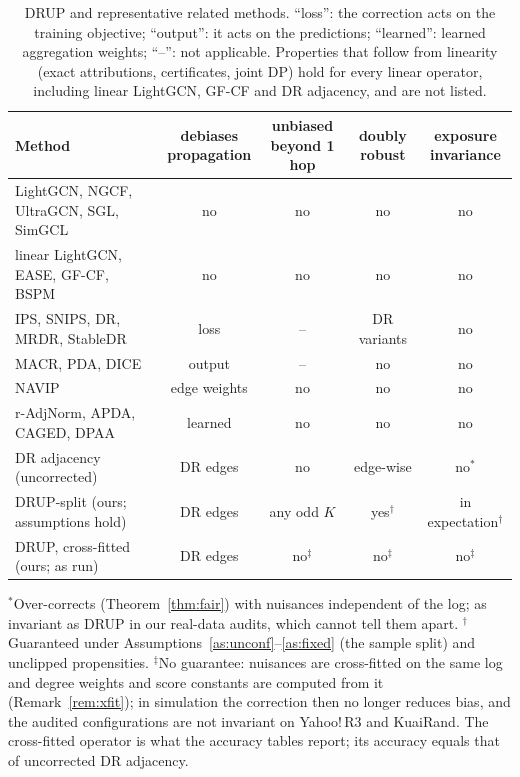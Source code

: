 \documentclass[preprint,review,12pt,authoryear]{elsarticle}
\theoremstyle{definition}
\begin{document}
\begin{table}[t]\centering\footnotesize
\caption{DRUP and representative related methods. ``loss'': the correction
acts on the training objective; ``output'': it acts on the predictions;
``learned'': learned aggregation weights; ``--'': not applicable. Properties
that follow from linearity (exact attributions, certificates, joint DP) hold
for every linear operator, including linear LightGCN, GF-CF and DR adjacency,
and are not listed.}\label{tab:related}
\setlength{\tabcolsep}{4pt}
\begin{adjustbox}{max width=\textwidth}
\begin{tabular}{lcccc}
\toprule
Method & \shortstack{debiases\\propagation} & \shortstack{unbiased\\beyond 1 hop} & \shortstack{doubly\\robust} &
\shortstack{exposure\\invariance}\\
\midrule
\shortstack[l]{LightGCN, NGCF,\\UltraGCN, SGL, SimGCL} & no & no & no & no\\[2pt]
\shortstack[l]{linear LightGCN,\\EASE, GF-CF, BSPM} & no & no & no & no\\[2pt]
\shortstack[l]{IPS, SNIPS, DR,\\MRDR, StableDR} & loss & -- & DR variants & no\\[2pt]
MACR, PDA, DICE & output & -- & no & no\\
NAVIP & edge weights & no & no & no\\
\shortstack[l]{r-AdjNorm, APDA,\\CAGED, DPAA} & learned & no & no & no\\[2pt]
DR adjacency (uncorrected) & DR edges & no & edge-wise & no$^\ast$\\
\midrule
DRUP-split (ours; assumptions hold) & DR edges & any odd $K$ & yes$^\dagger$ & in expectation$^\dagger$\\
DRUP, cross-fitted (ours; as run) & DR edges & no$^\ddagger$ & no$^\ddagger$ & no$^\ddagger$\\
\bottomrule
\end{tabular}
\end{adjustbox}
\par\smallskip
\raggedright\scriptsize $^\ast$Over-corrects (Theorem~\ref{thm:fair}) with nuisances independent of the log; as invariant as DRUP in our real-data audits, which cannot tell them apart.
$^\dagger$Guaranteed under Assumptions~\ref{as:unconf}--\ref{as:fixed} (the sample split) and unclipped propensities.
$^\ddagger$No guarantee: nuisances are cross-fitted on the same log and degree weights and score constants are computed from it
(Remark~\ref{rem:xfit}); in simulation the correction then no longer reduces bias, and the audited configurations are not invariant on Yahoo!\,R3 and KuaiRand.
The cross-fitted operator is what the accuracy tables report; its accuracy equals that of uncorrected DR adjacency.
\end{table}
\end{document}

